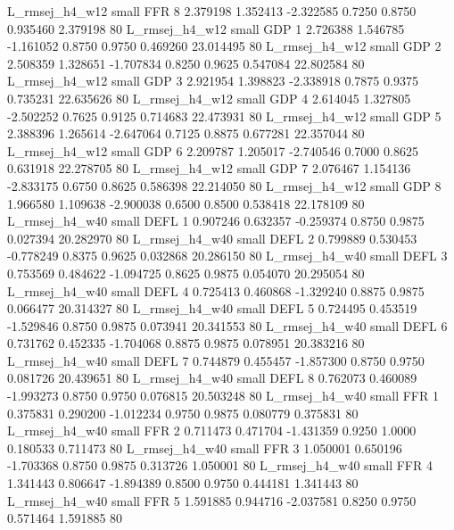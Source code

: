 L_rmsej_h4_w12      small      FFR                 8 2.379198 1.352413 -2.322585 0.7250 0.8750  0.935460    2.379198 80
L_rmsej_h4_w12      small      GDP                 1 2.726388 1.546785 -1.161052 0.8750 0.9750  0.469260   23.014495 80
L_rmsej_h4_w12      small      GDP                 2 2.508359 1.328651 -1.707834 0.8250 0.9625  0.547084   22.802584 80
L_rmsej_h4_w12      small      GDP                 3 2.921954 1.398823 -2.338918 0.7875 0.9375  0.735231   22.635626 80
L_rmsej_h4_w12      small      GDP                 4 2.614045 1.327805 -2.502252 0.7625 0.9125  0.714683   22.473931 80
L_rmsej_h4_w12      small      GDP                 5 2.388396 1.265614 -2.647064 0.7125 0.8875  0.677281   22.357044 80
L_rmsej_h4_w12      small      GDP                 6 2.209787 1.205017 -2.740546 0.7000 0.8625  0.631918   22.278705 80
L_rmsej_h4_w12      small      GDP                 7 2.076467 1.154136 -2.833175 0.6750 0.8625  0.586398   22.214050 80
L_rmsej_h4_w12      small      GDP                 8 1.966580 1.109638 -2.900038 0.6500 0.8500  0.538418   22.178109 80
L_rmsej_h4_w40      small     DEFL                 1 0.907246 0.632357 -0.259374 0.8750 0.9875  0.027394   20.282970 80
L_rmsej_h4_w40      small     DEFL                 2 0.799889 0.530453 -0.778249 0.8375 0.9625  0.032868   20.286150 80
L_rmsej_h4_w40      small     DEFL                 3 0.753569 0.484622 -1.094725 0.8625 0.9875  0.054070   20.295054 80
L_rmsej_h4_w40      small     DEFL                 4 0.725413 0.460868 -1.329240 0.8875 0.9875  0.066477   20.314327 80
L_rmsej_h4_w40      small     DEFL                 5 0.724495 0.453519 -1.529846 0.8750 0.9875  0.073941   20.341553 80
L_rmsej_h4_w40      small     DEFL                 6 0.731762 0.452335 -1.704068 0.8875 0.9875  0.078951   20.383216 80
L_rmsej_h4_w40      small     DEFL                 7 0.744879 0.455457 -1.857300 0.8750 0.9750  0.081726   20.439651 80
L_rmsej_h4_w40      small     DEFL                 8 0.762073 0.460089 -1.993273 0.8750 0.9750  0.076815   20.503248 80
L_rmsej_h4_w40      small      FFR                 1 0.375831 0.290200 -1.012234 0.9750 0.9875  0.080779    0.375831 80
L_rmsej_h4_w40      small      FFR                 2 0.711473 0.471704 -1.431359 0.9250 1.0000  0.180533    0.711473 80
L_rmsej_h4_w40      small      FFR                 3 1.050001 0.650196 -1.703368 0.8750 0.9875  0.313726    1.050001 80
L_rmsej_h4_w40      small      FFR                 4 1.341443 0.806647 -1.894389 0.8500 0.9750  0.444181    1.341443 80
L_rmsej_h4_w40      small      FFR                 5 1.591885 0.944716 -2.037581 0.8250 0.9750  0.571464    1.591885 80
